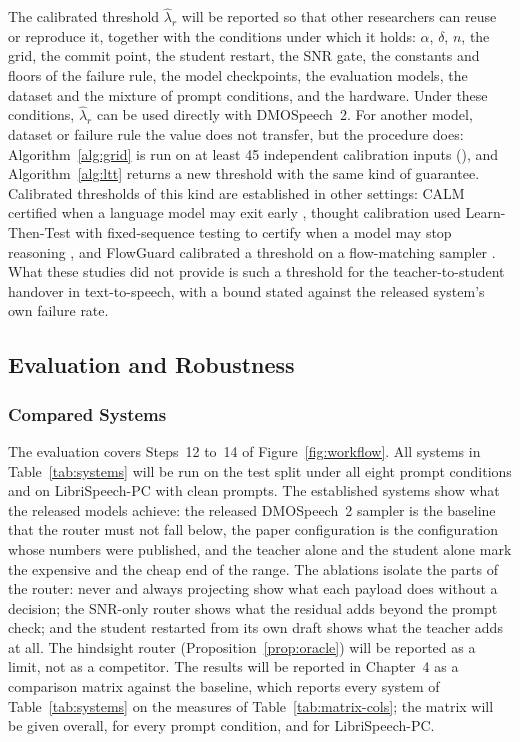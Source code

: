 The calibrated threshold $\hat\lambda_r$ will be reported so that other researchers can reuse or reproduce it, together with the conditions under which it holds: $\alpha$, $\delta$, $n$, the grid, the commit point, the student restart, the SNR gate, the constants and floors of the failure rule, the model checkpoints, the evaluation models, the dataset and the mixture of prompt conditions, and the hardware. Under these conditions, $\hat\lambda_r$ can be used directly with DMOSpeech~2. For another model, dataset or failure rule the value does not transfer, but the procedure does: Algorithm~\ref{alg:grid} is run on at least 45 independent calibration inputs (), and Algorithm~\ref{alg:ltt} returns a new threshold with the same kind of guarantee. Calibrated thresholds of this kind are established in other settings: CALM certified when a language model may exit early \parencite{schuster2022calm}, thought calibration used Learn-Then-Test with fixed-sequence testing to certify when a model may stop reasoning \parencite{wu2025thought}, and FlowGuard calibrated a threshold on a flow-matching sampler \parencite{li2025flowguard}. What these studies did not provide is such a threshold for the teacher-to-student handover in text-to-speech, with a bound stated against the released system's own failure rate.

\subsection{Evaluation and Robustness}
\label{sec:obj4}
\label{sec:analysis}

\subsubsection{Compared Systems}
\label{sec:compared}

The evaluation covers Steps~12 to~14 of Figure~\ref{fig:workflow}. All systems in Table~\ref{tab:systems} will be run on the test split under all eight prompt conditions and on LibriSpeech-PC with clean prompts. The established systems show what the released models achieve: the released DMOSpeech~2 sampler is the baseline that the router must not fall below, the paper configuration is the configuration whose numbers were published, and the teacher alone and the student alone mark the expensive and the cheap end of the range. The ablations isolate the parts of the router: never and always projecting show what each payload does without a decision; the SNR-only router shows what the residual adds beyond the prompt check; and the student restarted from its own draft shows what the teacher adds at all. The hindsight router (Proposition~\ref{prop:oracle}) will be reported as a limit, not as a competitor. The results will be reported in Chapter~4 as a comparison matrix against the baseline, which reports every system of Table~\ref{tab:systems} on the measures of Table~\ref{tab:matrix-cols}; the matrix will be given overall, for every prompt condition, and for LibriSpeech-PC.

